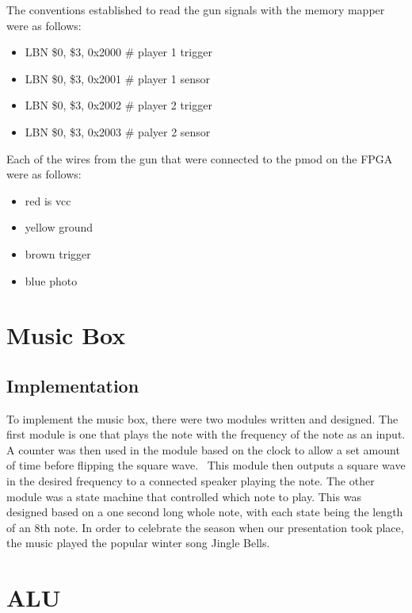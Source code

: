 \documentclass[letterpaper, 11 pt, conference]{article}
\begin{document}
The conventions established to read the gun signals with the memory mapper were as follows:

\begin{itemize}
    \item LBN \$0, \$3, 0x2000 \# player 1 trigger
    \item LBN \$0, \$3, 0x2001 \# player 1 sensor
    \item LBN \$0, \$3, 0x2002 \# player 2 trigger
    \item LBN \$0, \$3, 0x2003 \# palyer 2 sensor
\end{itemize}

Each of the wires from the gun that were connected to the pmod on the FPGA were as follows: 
\begin{itemize}
\item red is vcc
\item yellow ground
\item brown trigger
\item blue photo
\end{itemize}


\section{Music Box}

\subsection{Implementation}
To implement the music box, there were two modules written and designed. The first module is one that plays the note with the frequency of the note as an input. A counter was then used in the module based on the clock to allow a set amount of time before flipping the square wave.  This module then outputs a square wave in the desired frequency to a connected speaker playing the note. The other module was a state machine that controlled which note to play. This was designed based on a one second long whole note, with each state being the length of an 8th note. In order to celebrate the season when our presentation took place, the music played the popular winter song Jingle Bells.


\section{ALU}
\end{document}
